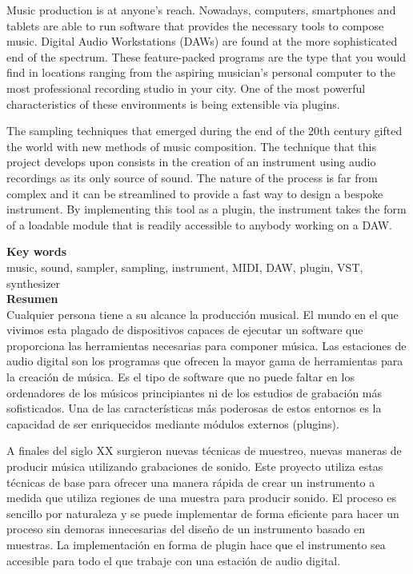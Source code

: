 \documentclass[12pt, a4paper, hidelinks]{article}
\begin{document}
	\normalsize
	Music production is at anyone's reach. Nowadays, computers, smartphones and tablets are able to run software that provides the necessary tools to compose music. Digital Audio Workstations (DAWs) are found at the more sophisticated end of the spectrum. These feature-packed programs are the type that you would find in locations ranging from the aspiring musician's personal computer to the most professional recording studio in your city. One of the most powerful characteristics of these environments is being extensible via plugins. \par	
	The sampling techniques that emerged during the end of the 20th century gifted the world with new methods of music composition. The technique that this project develops upon consists in the creation of an instrument using audio recordings as its only source of sound. The nature of the process is far from complex and it can be streamlined to provide a fast way to design a bespoke instrument. By implementing this tool as a plugin, the instrument takes the form of a loadable module that is readily accessible to anybody working on a DAW.
	
	\vspace*{\fill}
	\large
	\textbf{Key words}\\
	
	\vspace{-1em}
	\normalsize	
	\noindent music, sound, sampler, sampling, instrument, MIDI, DAW, plugin, VST, synthesizer\\

	\newpage
	\huge
	\textbf{Resumen}\\
	
	\normalsize
	Cualquier persona tiene a su alcance la producción musical. El mundo en el que vivimos esta plagado de dispositivos capaces de ejecutar un software que proporciona las herramientas necesarias para componer música. Las estaciones de audio digital son los programas que ofrecen la mayor gama de herramientas para la creación de música. Es el tipo de software que no puede faltar en los ordenadores de los músicos principiantes ni de los estudios de grabación más sofisticados. Una de las características más poderosas de estos entornos es la capacidad de ser enriquecidos mediante módulos externos (plugins). \par 
	
	A finales del siglo XX surgieron nuevas técnicas de muestreo, nuevas maneras de producir música utilizando grabaciones de sonido. Este proyecto utiliza estas técnicas de base para ofrecer una manera rápida de crear un instrumento a medida que utiliza regiones de una muestra para producir sonido. El proceso es sencillo por naturaleza y se puede implementar de forma eficiente para hacer un proceso sin demoras innecesarias del diseño de un instrumento basado en muestras. La implementación en forma de plugin hace que el instrumento sea accesible para todo el que trabaje con una estación de audio digital.
\end{document}
